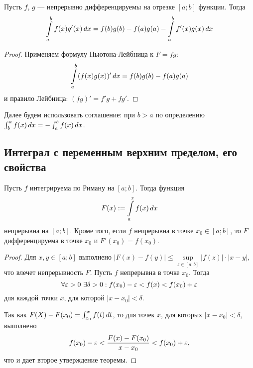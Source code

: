 \documentclass[a4paper]{article}
\theoremstyle{named}
\renewcommand{\int}{\intop}
\begin{document}
        \begin{consequence*}
            Пусть $f$, $g$ --- непрерывно дифференцируемы на отрезке $[a; b]$ функции. Тогда
            \begin{equation*}
                \int_a^b f(x) g'(x) \dd x = f(b) g(b) - f(a) g(a) - \int_a^b f'(x) g(x) \dd x
            \end{equation*}
        \end{consequence*}

        \begin{proof}
            Применяем формулу Ньютона-Лейбница к $F = fg$:
            \begin{equation*}
                \int_a^b (f(x)g(x))' \dd x = f(b)g(b) - f(a)g(a)
            \end{equation*}
            и правило Лейбница: $(fg)' = f'g + fg'$.
        \end{proof}

        Далее будем использовать соглашение: при $b > a$ по определению $\int_b^a f(x) \dd x = - \int_a^b f(x) \dd x$.

        \subsection{Интеграл с переменным верхним пределом, его свойства}

        \begin{theorem*}
            Пусть $f$ интегрируема по Риману на $[a; b]$. Тогда функция
            \begin{equation*}
                F(x) := \int_a^x f(x) \dd x
            \end{equation*}
            непрерывна на $[a; b]$. Кроме того, если $f$ непрерывна в точке $x_0 \in [a; b]$, то $F$ дифференцируема в точке $x_0$ и $F'(x_0) = f(x_0)$.
        \end{theorem*}

        \begin{proof}
            Для $x, y \in [a; b]$ выполнено $|F(x) - f(y)| \leq \sup\limits_{z \in [a; b]} |f(z)| \cdot |x - y|$, что влечет непрерывность $F$. Пусть $f$ непрерывна в точке $x_0$. Тогда
            \begin{equation*}
                \forall \varepsilon > 0 \ \exists \delta > 0: f(x_0) - \varepsilon < f(x) < f(x_0) + \varepsilon
            \end{equation*}
            для каждой точки $x$, для которой $|x - x_0| < \delta$.

            Так как $F(X) - F(x_0) = \int_{x_0}^x f(t) \dd t$, то для точек $x$, для которых $|x - x_0| < \delta$, выполнено
            \begin{equation*}
                f(x_0) - \varepsilon < \dfrac{F(x) - F(x_0)}{x - x_0} < f(x_0) + \varepsilon,
            \end{equation*}
            что и дает второе утверждение теоремы.
        \end{proof}
\end{document}
